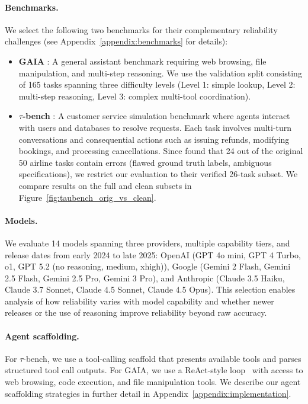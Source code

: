 \documentclass[11pt]{article}
\begin{document}
\paragraph{Benchmarks.}
We select the following two benchmarks for their complementary reliability challenges (see Appendix~\ref{appendix:benchmarks} for details):
\begin{itemize}[leftmargin=*, topsep=1pt, itemsep=1pt]
    \item \textbf{GAIA} \citep{mialon2023gaia}: A general assistant benchmark requiring web browsing, file manipulation, and multi-step reasoning. We use the validation split consisting of 165 tasks spanning three difficulty levels (Level 1: simple lookup, Level 2: multi-step reasoning, Level 3: complex multi-tool coordination).
    \item \textbf{$\tau$-bench} \citep{yao2024tau}: A customer service simulation benchmark where agents interact with users and databases to resolve requests. Each task involves multi-turn conversations and consequential actions such as issuing refunds, modifying bookings, and processing cancellations. Since \citet{cuadron2025saber} found that 24 out of the original 50 airline tasks contain errors (flawed ground truth labels, ambiguous specifications), we restrict our evaluation to their verified 26-task subset. We compare results on the full and clean subsets in Figure~\ref{fig:taubench_orig_vs_clean}.
\end{itemize}

\paragraph{Models.}
We evaluate 14 models spanning three providers, multiple capability tiers, and release dates from early 2024 to late 2025: OpenAI (GPT 4o mini, GPT 4 Turbo, o1, GPT 5.2 (no reasoning, medium, xhigh)), Google (Gemini 2 Flash, Gemini 2.5 Flash, Gemini 2.5 Pro, Gemini 3 Pro), and Anthropic (Claude 3.5 Haiku, Claude 3.7 Sonnet, Claude 4.5 Sonnet, Claude 4.5 Opus). This selection enables analysis of how reliability varies with model capability and whether newer releases or the use of reasoning improve reliability beyond raw accuracy.

\paragraph{Agent scaffolding.} For $\tau$-bench, we use a tool-calling scaffold that presents available tools and parses structured tool call outputs. For GAIA, we use a ReAct-style loop~\citep{yao2022react} with access to web browsing, code execution, and file manipulation tools. We describe our agent scaffolding strategies in further detail in Appendix~\ref{appendix:implementation}.
\end{document}
